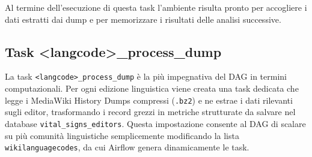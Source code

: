 Al termine dell’esecuzione di questa task l’ambiente risulta pronto per accogliere i dati estratti dai dump e per memorizzare i risultati delle analisi successive.

\subsection{Task \textless langcode\textgreater\_process\_dump}
\label{subsec:process_dump}

La task \texttt{<langcode>\_process\_dump} è la più impegnativa del DAG in termini computazionali. 
Per ogni edizione linguistica viene creata una task dedicata che legge i MediaWiki History Dumps compressi (\texttt{.bz2}) e ne estrae i dati rilevanti sugli editor, trasformando i record grezzi in metriche strutturate da salvare nel database \texttt{vital\_signs\_editors}. 
Questa impostazione consente al DAG di scalare su più comunità linguistiche semplicemente modificando la lista \texttt{wikilanguagecodes}, da cui Airflow genera dinamicamente le task.

